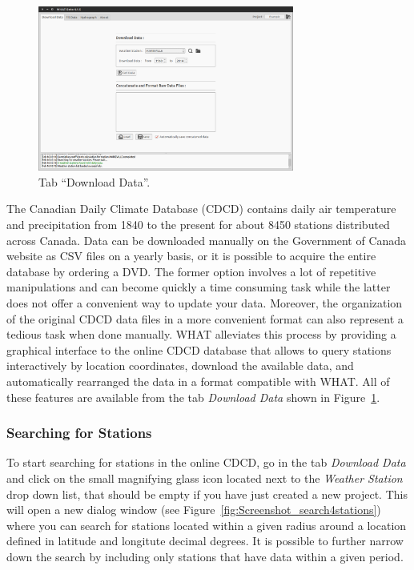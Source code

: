 \documentclass[12pt, letterpaper, fleqn]{report}
\begin{document}
\begin{figure}[h!]
\centering
\includegraphics[width=0.75\textwidth]{WHAT_Screenshot000}
\caption[Tab ``Download Data''.]{Tab ``Download Data''.}
\label{fig:tab_dwnldData}
\end{figure}

The Canadian Daily Climate Database (CDCD) contains daily air temperature and precipitation from 1840 to the present for about 8450 stations distributed across Canada. Data can be downloaded manually on the Government of Canada website as CSV files on a yearly basis, or it is possible to acquire the entire database by ordering a DVD. The former option involves a lot of repetitive manipulations and can become quickly a time consuming task while the latter does not offer a convenient way to update your data. Moreover, the organization of the original CDCD data files in a more convenient format can also represent a tedious task when done manually. WHAT alleviates this process by providing a graphical interface to the online CDCD database that allows to query stations interactively by location coordinates, download the available data, and automatically rearranged the data in a format compatible with WHAT. All of these features are available from the tab \emph{Download Data} shown in Figure~\ref{fig:tab_dwnldData}.

\subsubsection{Searching for Stations}

To start searching for stations in the online CDCD, go in the tab \emph{Download Data} and click on the small magnifying glass icon located next to the \emph{Weather Station} drop down list, that should be empty if you have just created a new project. This will open a new dialog window (see Figure~\ref{fig:Screenshot_search4stations}) where you can search for stations located within a given radius around a location defined in latitude and longitute decimal degrees. It is possible to further narrow down the search by including only stations that have data within a given period. 
\end{document}
